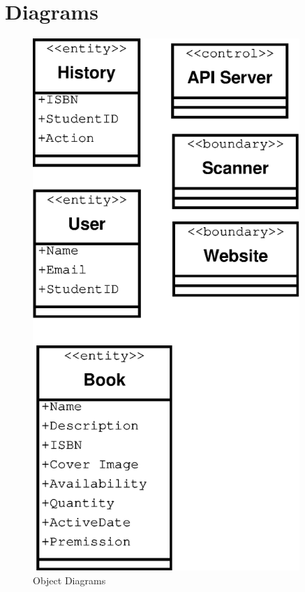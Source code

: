 \documentclass[a4paper, 10pt, oneside, draft]{article}
\begin{document}
\newpage

\section{Diagrams}

\begin{figure}[p]
    \centering
    \includegraphics[width=0.9\textwidth]{Objects.eps}
    \caption{Object Diagrams}
    \label{fig:objects_image}
\end{figure}
\end{document}
